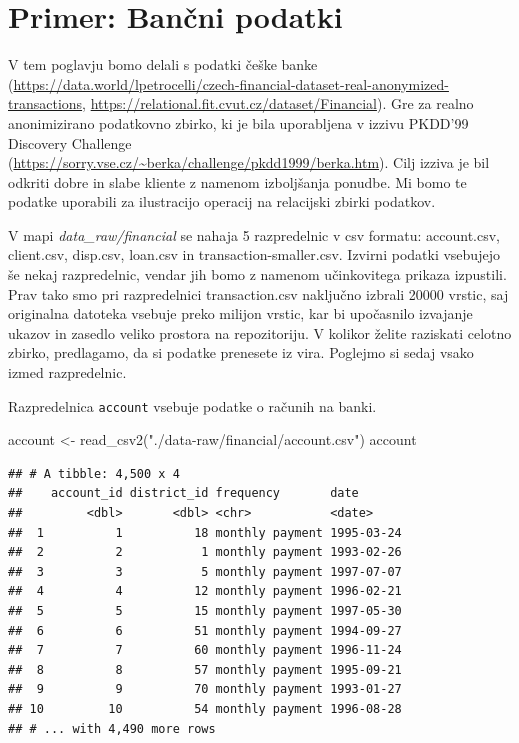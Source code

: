 \documentclass[
]{book}
\newenvironment{Shaded}{\begin{snugshade}}{\end{snugshade}}
\newcommand{\FunctionTok}[1]{\textcolor[rgb]{0.00,0.00,0.00}{#1}}
\newcommand{\NormalTok}[1]{#1}
\newcommand{\OtherTok}[1]{\textcolor[rgb]{0.56,0.35,0.01}{#1}}
\newcommand{\StringTok}[1]{\textcolor[rgb]{0.31,0.60,0.02}{#1}}
\begin{document}
\hypertarget{primer-banux10dni-podatki}{%
\section{Primer: Bančni podatki}\label{primer-banux10dni-podatki}}

V tem poglavju bomo delali s podatki češke banke (\url{https://data.world/lpetrocelli/czech-financial-dataset-real-anonymized-transactions}, \url{https://relational.fit.cvut.cz/dataset/Financial}). Gre za realno anonimizirano podatkovno zbirko, ki je bila uporabljena v izzivu PKDD'99 Discovery Challenge (\url{https://sorry.vse.cz/~berka/challenge/pkdd1999/berka.htm}). Cilj izziva je bil odkriti dobre in slabe kliente z namenom izboljšanja ponudbe. Mi bomo te podatke uporabili za ilustracijo operacij na relacijski zbirki podatkov.

V mapi \emph{data\_raw/financial} se nahaja 5 razpredelnic v csv formatu: account.csv, client.csv, disp.csv, loan.csv in transaction-smaller.csv. Izvirni podatki vsebujejo še nekaj razpredelnic, vendar jih bomo z namenom učinkovitega prikaza izpustili. Prav tako smo pri razpredelnici transaction.csv naključno izbrali 20000 vrstic, saj originalna datoteka vsebuje preko milijon vrstic, kar bi upočasnilo izvajanje ukazov in zasedlo veliko prostora na repozitoriju. V kolikor želite raziskati celotno zbirko, predlagamo, da si podatke prenesete iz vira. Poglejmo si sedaj vsako izmed razpredelnic.

Razpredelnica \texttt{account} vsebuje podatke o računih na banki.

\begin{Shaded}
\begin{Highlighting}[]
\NormalTok{account }\OtherTok{\textless{}{-}} \FunctionTok{read\_csv2}\NormalTok{(}\StringTok{"./data{-}raw/financial/account.csv"}\NormalTok{)}
\NormalTok{account}
\end{Highlighting}
\end{Shaded}

\begin{verbatim}
## # A tibble: 4,500 x 4
##    account_id district_id frequency       date      
##         <dbl>       <dbl> <chr>           <date>    
##  1          1          18 monthly payment 1995-03-24
##  2          2           1 monthly payment 1993-02-26
##  3          3           5 monthly payment 1997-07-07
##  4          4          12 monthly payment 1996-02-21
##  5          5          15 monthly payment 1997-05-30
##  6          6          51 monthly payment 1994-09-27
##  7          7          60 monthly payment 1996-11-24
##  8          8          57 monthly payment 1995-09-21
##  9          9          70 monthly payment 1993-01-27
## 10         10          54 monthly payment 1996-08-28
## # ... with 4,490 more rows
\end{verbatim}
\end{document}
